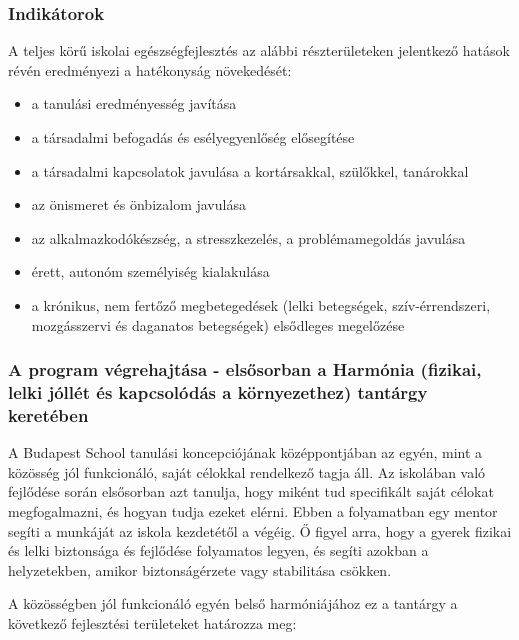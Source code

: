 \subsubsection{Indikátorok}\label{indikuxe1torok}

A teljes körű iskolai egészségfejlesztés az alábbi részterületeken
jelentkező hatások révén eredményezi a hatékonyság növekedését:

\begin{itemize}

\item
  a tanulási eredményesség javítása
\item
  a társadalmi befogadás és esélyegyenlőség elősegítése
\item
  a társadalmi kapcsolatok javulása a kortársakkal, szülőkkel,
  tanárokkal
\item
  az önismeret és önbizalom javulása
\item
  az alkalmazkodókészség, a stresszkezelés, a problémamegoldás javulása
\item
  érett, autonóm személyiség kialakulása
\item
  a krónikus, nem fertőző megbetegedések (lelki betegségek,
  szív-érrendszeri, mozgásszervi és daganatos betegségek) elsődleges
  megelőzése
\end{itemize}

\subsubsection{A program végrehajtása - elsősorban a Harmónia (fizikai,
lelki jóllét és kapcsolódás a környezethez) tantárgy
keretében}

A Budapest School tanulási koncepciójának középpontjában az egyén, mint
a közösség jól funkcionáló, saját célokkal rendelkező tagja áll. Az
iskolában való fejlődése során elsősorban azt tanulja, hogy miként tud
specifikált saját célokat megfogalmazni, és hogyan tudja ezeket elérni.
Ebben a folyamatban egy mentor segíti a munkáját az iskola kezdetétől a
végéig. Ő figyel arra, hogy a gyerek fizikai és lelki biztonsága és
fejlődése folyamatos legyen, és segíti azokban a helyzetekben, amikor
biztonságérzete vagy stabilitása csökken.

A közösségben jól funkcionáló egyén belső harmóniájához ez a tantárgy a
következő fejlesztési területeket határozza meg:


